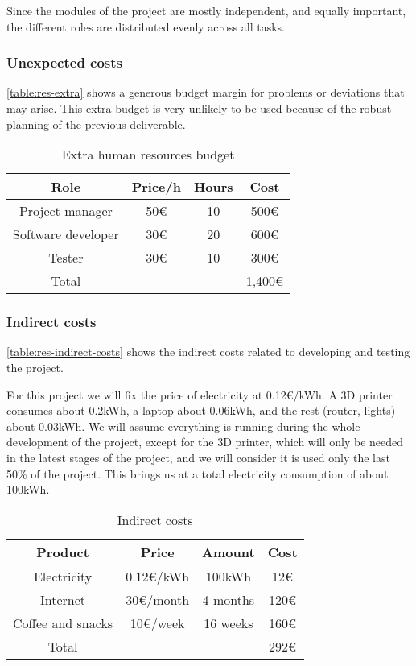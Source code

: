 Since the modules of the project are mostly independent, and equally important, the different roles are distributed evenly across all tasks.

\subsubsection{Unexpected costs}
\autoref{table:res-extra} shows a generous budget margin for problems or deviations that may arise. This extra budget is very unlikely to be used because of the robust planning of the previous deliverable.


\begin{table}[h!]
\centering
\begin{tabular}{ |c|c|c|c| } 
    \hline
    Role & Price/h & Hours & Cost \\
    \hline
    \hline
    Project manager & 50€ & 10 & 500€ \\
    \hline
    Software developer & 30€ & 20 & 600€ \\
    \hline
    Tester & 30€ & 10 & 300€ \\
    \hline
    \hline
    Total & & & 1,400€ \\
    \hline
\end{tabular}
\caption{Extra human resources budget}\label{table:res-extra}
\end{table}


\subsubsection{Indirect costs}

\autoref{table:res-indirect-costs}
shows the indirect costs related to developing and testing the project.

For this project we will fix the price of electricity at 0.12€/kWh. A 3D printer consumes about 0.2kWh, a laptop about 0.06kWh, and the rest (router, lights) about 0.03kWh. We will assume everything is running during the whole development of the project, except for the 3D printer, which will only be needed in the latest stages of the project, and we will consider it is used only the last 50\% of the project. This brings us at a total electricity consumption of about 100kWh.


\begin{table}[h!]
\centering
\begin{tabular}{ |c|c|c|c| } 
    \hline
    Product & Price & Amount & Cost \\
    \hline
    \hline
    Electricity & 0.12€/kWh & 100kWh & 12€ \\
    \hline
    Internet & 30€/month & 4 months & 120€ \\
    \hline
    Coffee and snacks & 10€/week & 16 weeks & 160€ \\
    \hline
    \hline
    Total & & & 292€ \\
    \hline
\end{tabular}
\caption{Indirect costs}\label{table:res-indirect-costs}
\end{table}

